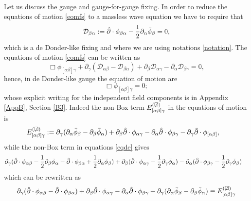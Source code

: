 \documentclass[a4paper,12pt]{article}
\begin{document}
Let us discuss the gauge and gauge-for-gauge fixing. In order to reduce the equations of motion \eqref{eomfs} to a massless wave equation we have to require that
\begin{equation}
    \mathcal{D}_{\beta \alpha }:=\hat{\partial} \cdot \phi_{ \beta \alpha}-\frac{1}{2}\partial_{\alpha}\Bar{\phi}_{\beta}=0,
    \label{ddg}
\end{equation}
which is a de Donder-like fixing and where we are using notations \eqref{notation}. The equations of motion \eqref{eomfs} can be written as
\begin{equation}
    \Box \phi_{[\alpha \beta]\gamma}+\partial_{\gamma}(\mathcal{D}_{\alpha \beta}-\mathcal{D}_{\beta \alpha})+\partial_{\beta}\mathcal{D}_{\alpha \gamma}-\partial_{\alpha}\mathcal{D}_{\beta \gamma}=0,
    \label{eqde}
\end{equation}
hence, in de Donder-like gauge the equation of motion are 
\begin{equation}
    \Box \phi_{[\alpha \beta ]\gamma}=0;
    \label{eom}
\end{equation}
whose explicit writing for the independent field components is in Appendix \ref{AppB}, Section \ref{B3}. Indeed the non-Box term $E_{[\alpha \beta] \gamma}^{(\not \Box)}$  in the equations of motion is
\begin{equation}
\begin{aligned}
E_{[\alpha \beta] \gamma}^{(\not \Box)}&:=\partial_{\gamma}(\partial_{\alpha}\Bar{\phi}_{\beta}-\partial_{\beta}\Bar{\phi}_{\alpha})+\partial_{\beta}\hat{\partial} \cdot \phi_{\alpha \gamma}-\partial_{\alpha}\hat{\partial} \cdot \phi_{\beta \gamma}-\partial_{\gamma}\Bar{\partial} \cdot \phi_{[\alpha \beta]},
\end{aligned}
\end{equation}
while the non-Box term in equations \eqref{eqde} gives
\begin{equation}
\begin{aligned}
    &\partial_{\gamma}(\hat{\partial} \cdot \phi_{ \alpha \beta}-\frac{1}{2}\partial_{\beta}\Bar{\phi}_{\alpha}-\hat{\partial} \cdot \phi_{ \beta \alpha}+\frac{1}{2}\partial_{\alpha}\Bar{\phi}_{\beta})+\partial_{\beta}(\hat{\partial} \cdot \phi_{ \alpha \gamma}-\frac{1}{2}\partial_{\gamma}\Bar{\phi}_{\alpha})-\partial_{\alpha}(\hat{\partial} \cdot \phi_{ \beta \gamma}-\frac{1}{2}\partial_{\gamma}\Bar{\phi}_{\beta})
\end{aligned}
\end{equation}
which can be rewritten as
\begin{equation}
\begin{aligned}
    \partial_{\gamma}(\hat{\partial} \cdot \phi_{ \alpha \beta}-\hat{\partial} \cdot \phi_{  \beta \alpha})+\partial_{\beta}\hat{\partial} \cdot \phi_{\alpha \gamma}-\partial_{\alpha}\hat{\partial} \cdot \phi_{\beta \gamma}+\partial_{\gamma}(\partial_{\alpha}\Bar{\phi}_{\beta}-\partial_{\beta}\Bar{\phi}_{\alpha})\equiv E_{[\alpha \beta] \gamma}^{(\not \Box)}
\end{aligned}
\end{equation}
\end{document}
